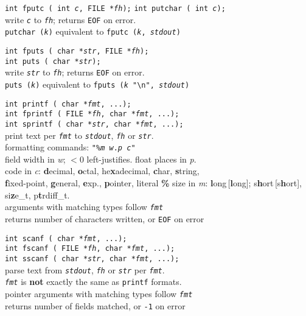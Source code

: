 \documentclass[8pt]{article}
\newcommand{\Cc}[1]{\texttt{#1}}
\newcommand{\ty}[1]{\textcolor{blue!80}{\texttt{#1}}} %
\newcommand{\kv}[1]{\textcolor{red!40!black}{\texttt{#1}}} %
\newcommand{\val}[1]{\texttt{#1}} %
\newcommand{\quo}[1]{\textcolor{violet!80!black}{\texttt{#1}}} %
\newcommand{\quot}[1]{\quo{"#1"}} %
\newcommand{\fn}[1]{\texttt{#1}} %
\newcommand{\var}[1]{\texttt{\textit{#1}}} %
\newcommand{\opt}[1]{\textrm{\textit{#1}}} %
\newcommand{\htab}{\hspace*{2em}} %
\newcommand{\Cx}{\textbackslash} %
\begin{document}
\begin{multicols}{3}
\Cc{\ty{int} \fn{fputc}\,(%
    \ty{int} \var{c},
    \ty{FILE *}\var{fh});}\hfill
\Cc{\ty{int} \fn{putchar}\,(%
    \ty{int} \var{c});}\\
\htab write \var{c} to \var{fh}; returns \kv{EOF} on error. \\
\htab \Cc{\fn{putchar}\,(\opt{k})} equivalent to \Cc{\fn{fputc}\,(\opt{k}, \var{stdout})}

\Cc{\ty{int} \fn{fputs}\,(%
    \ty{char *}\var{str},
    \ty{FILE *}\var{fh});}\\
\Cc{\ty{int} \fn{puts}\,(%
    \ty{char *}\var{str});}\\
\htab write \var{str} to \var{fh}; returns \kv{EOF} on error. \\
\htab \Cc{\fn{puts}\,(\opt{k})} equivalent to \Cc{\fn{fputs}\,(\opt{k} "\Cx n", \var{stdout})}

\Cc{\ty{int} \fn{printf}\,(%
    \ty{char *}\var{fmt}, ...);} \\
\Cc{\ty{int} \fn{fprintf}\,(%
    \ty{FILE *}\var{fh}, %
    \ty{char *}\var{fmt}, ...);} \\
\Cc{\ty{int} \fn{sprintf}\,(%
    \ty{char *}\var{str}, %
    \ty{char *}\var{fmt}, ...);} \\
\htab print text per \var{fmt} to \var{stdout}, \var{fh} or \var{str}. \\
\htab formatting commands: \Cc{\quot{\%\opt{m}\,\opt{w}.\opt{p}\,\opt{c}}}\\
\htab field width in \opt{w}; $<0$ left-justifies. float places in \opt{p}. \\
\htab code in \opt{c}: \textbf{d}ecimal, \textbf{o}ctal,
    he\textbf{x}adecimal, \textbf{c}har, \textbf{s}tring, \\
\htab\htab \textbf{f}ixed-point, \textbf{g}eneral, \textbf{e}xp.,
    \textbf{p}ointer, literal \textbf{\%}
\htab size in \opt{m}: \textbf{l}ong\,[\textbf{l}ong]; s\textbf{h}ort\,[s\textbf{h}ort], si\textbf{z}e\_t, p\textbf{t}rdiff\_t. \\
\htab arguments with matching types follow \var{fmt} \\
\htab returns number of characters written, or \kv{EOF} on error

\Cc{\ty{int} \fn{scanf}\,(%
    \ty{char *}\var{fmt}, ...);} \\
\Cc{\ty{int} \fn{fscanf}\,(%
    \ty{FILE *}\var{fh}, %
    \ty{char *}\var{fmt}, ...);} \\
\Cc{\ty{int} \fn{sscanf}\,(%
    \ty{char *}\var{str}, %
    \ty{char *}\var{fmt}, ...);} \\
\htab parse text from \var{stdout}, \var{fh} or \var{str} per \var{fmt}. \\
\htab \var{fmt} is \textbf{not} exactly the same as \fn{printf} formats. \\
\htab pointer arguments with matching types follow \var{fmt} \\
\htab returns number of fields matched, or \val{-1} on error

\end{multicols}
\end{document}
